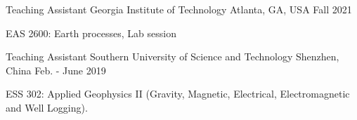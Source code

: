 

\begin{cventries}

  \cventry
    {Teaching Assistant} %
    {Georgia Institute of Technology} %
    {Atlanta, GA, USA} %
    {Fall 2021} %
    {
      \begin{cvitems} %
        \item {EAS 2600: Earth processes, Lab session}
      \end{cvitems}
    }


  \cventry
    {Teaching Assistant} %
    {Southern University of Science and Technology} %
    {Shenzhen, China} %
    {Feb. - June 2019} %
    {
      \begin{cvitems} %
        \item {ESS 302: Applied Geophysics II (Gravity, Magnetic, Electrical, Electromagnetic and Well Logging).}
      \end{cvitems}
    }

\end{cventries}
